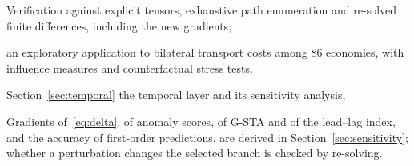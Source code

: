 Verification against explicit tensors, exhaustive path enumeration and re-solved finite differences, including the new gradients;

an exploratory application to bilateral transport costs among 86 economies, with influence measures and counterfactual stress tests.

Section~\ref{sec:temporal} the temporal layer and its sensitivity analysis,

Gradients of~\eqref{eq:delta}, of anomaly scores, of G-STA and of the lead--lag index, and the accuracy of first-order predictions, are derived in Section~\ref{sec:sensitivity}; whether a perturbation changes the selected branch is checked by re-solving.

